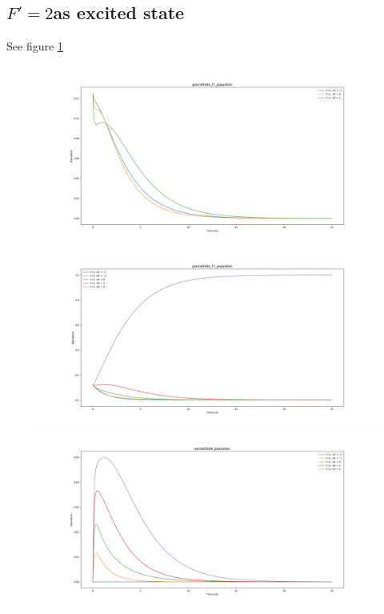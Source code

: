 \documentclass[a4paper, 10pt]{article}
\begin{document}
\subsection{$F\prime = 2$as excited state}
See figure \ref{fig8}\\
\begin{figure}[h]
  \centering
  \caption{}
  \includegraphics[width = 1.15\textwidth]{f2fig1}
  \includegraphics[width = 1.15\textwidth]{f2fig2}
  \includegraphics[width = 1.15\textwidth]{f2fig3}
  \label{fig8}
\end{figure}
\end{document}
